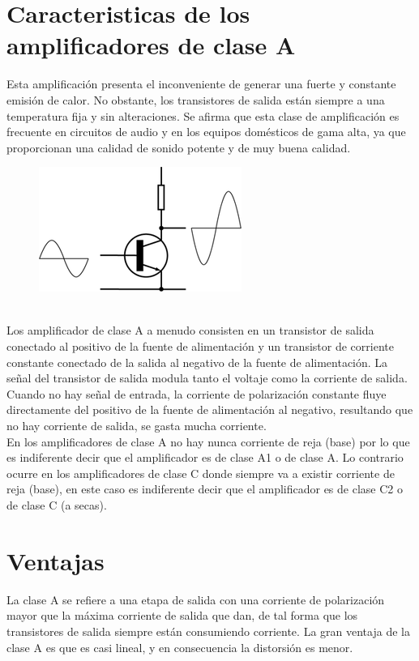 \documentclass[12pt,a4paper]{article}
\begin{document}
\section{Caracteristicas de los amplificadores de clase A \\ }
Esta amplificación presenta el inconveniente de generar una fuerte y constante emisión de calor. No obstante, los transistores de salida están siempre a una temperatura fija y sin alteraciones.
Se afirma que esta clase de amplificación es frecuente en circuitos de audio y en los equipos domésticos de gama alta, ya que proporcionan una calidad de sonido potente y de muy buena calidad.\\
\begin{figure}[h!]
\centering
\includegraphics[scale=1]{250px-Electronic_Amplifier_Class_A.png} 
\end{figure}\\
Los amplificador de clase A a menudo consisten en un transistor de salida conectado al positivo de la fuente de alimentación y un transistor de corriente constante conectado de la salida al negativo de la fuente de alimentación.
La señal del transistor de salida modula tanto el voltaje como la corriente de salida. Cuando no hay señal de entrada, la corriente de polarización constante fluye directamente del positivo de la fuente de alimentación al negativo, resultando que no hay corriente de salida, se gasta mucha corriente.\\ 
\newpage
En los amplificadores de clase A no hay nunca corriente de reja (base) por lo que es indiferente decir que el amplificador es de clase A1 o de clase A. Lo contrario ocurre en los amplificadores de clase C donde siempre va a existir corriente de reja (base), en este caso es indiferente decir que el amplificador es de clase C2 o de clase C (a secas).\\
\section{Ventajas}
La clase A se refiere a una etapa de salida con una corriente de polarización mayor que la máxima corriente de salida que dan, de tal forma que los transistores de salida siempre están consumiendo corriente. La gran ventaja de la clase A es que es casi lineal, y en consecuencia la distorsión es menor.
\end{document}
